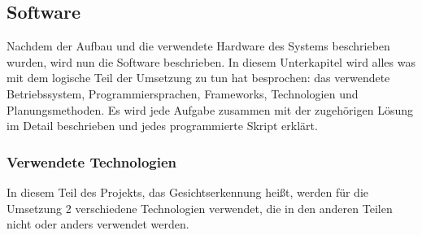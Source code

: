 \subsection{Software}
Nachdem der Aufbau und die verwendete Hardware des Systems beschrieben wurden, wird nun die Software beschrieben. In diesem Unterkapitel wird alles was mit dem logische Teil der Umsetzung zu tun hat besprochen: das verwendete Betriebssystem, Programmiersprachen, Frameworks, Technologien und Planungsmethoden. Es wird jede Aufgabe zusammen mit der zugehörigen Lösung im Detail beschrieben und jedes programmierte Skript erklärt.
\subsubsection{Verwendete Technologien}
In diesem Teil des Projekts, das Gesichtserkennung heißt, werden für die Umsetzung 2 verschiedene Technologien verwendet, die in den anderen Teilen nicht oder anders verwendet werden.

